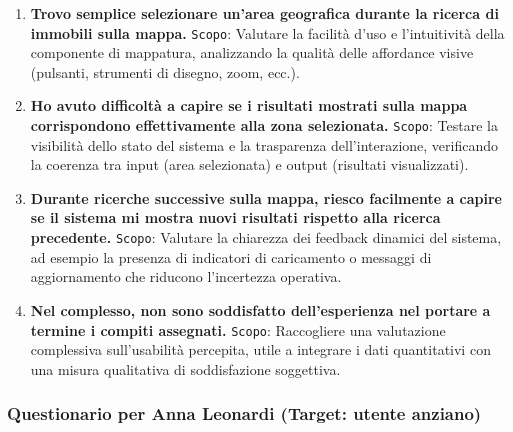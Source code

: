 \begin{enumerate}
	\item \textbf{Trovo semplice selezionare un’area geografica durante la ricerca di immobili sulla mappa.}
	\newline
	\texttt{Scopo}: Valutare la facilità d’uso e l’intuitività della componente di mappatura, analizzando la qualità delle affordance visive (pulsanti, strumenti di disegno, zoom, ecc.).
	
	\item \textbf{Ho avuto difficoltà a capire se i risultati mostrati sulla mappa corrispondono effettivamente alla zona selezionata.}
	\newline
	\texttt{Scopo}: Testare la visibilità dello stato del sistema e la trasparenza dell’interazione, verificando la coerenza tra input (area selezionata) e output (risultati visualizzati).
	
	\item \textbf{Durante ricerche successive sulla mappa, riesco facilmente a capire se il sistema mi mostra nuovi risultati rispetto alla ricerca precedente.}
	\newline
	\texttt{Scopo}: Valutare la chiarezza dei feedback dinamici del sistema, ad esempio la presenza di indicatori di caricamento o messaggi di aggiornamento che riducono l’incertezza operativa.
	
	\item \textbf{Nel complesso, non sono soddisfatto dell’esperienza nel portare a termine i compiti assegnati.}
	\newline
	\texttt{Scopo}: Raccogliere una valutazione complessiva sull’usabilità percepita, utile a integrare i dati quantitativi con una misura qualitativa di soddisfazione soggettiva.
	
\end{enumerate}

\vspace{0.5cm} %
\subsubsection*{Questionario per Anna Leonardi (Target: utente anziano)}
\vspace{0.5cm} %


